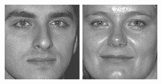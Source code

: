 \begin{figure}[ht]
\begin{center}
  \includegraphics[width=\columnwidth/10]{ch5/figures/feret17.jpg}
  \includegraphics[width=\columnwidth/10]{ch5/figures/feret18.jpg}\\

\end{center}
\end{figure}
